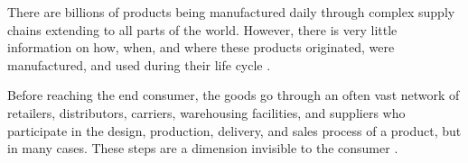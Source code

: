 There are billions of products being manufactured daily through complex supply chains extending to all parts of the world. However, there is very little information on how, when, and where these products originated, were manufactured, and used during their life cycle \cite{horiuchirastreabilidade}.

Before reaching the end consumer, the goods go through an often vast network of retailers, distributors, carriers, warehousing facilities, and suppliers who participate in the design, production, delivery, and sales process of a product, but in many cases. These steps are a dimension invisible to the consumer \cite{provenance2015}.